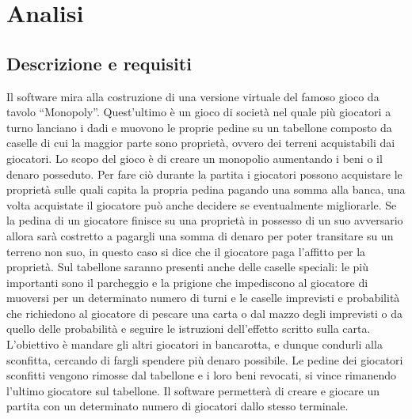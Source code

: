 \chapter{Analisi}

\section{Descrizione e requisiti}
Il software mira alla costruzione di una versione virtuale del famoso gioco da tavolo “Monopoly”. 
Quest’ultimo è un gioco di società nel quale più giocatori a turno lanciano i dadi e muovono le proprie pedine su un tabellone 
composto da caselle di cui la maggior parte sono proprietà, ovvero dei terreni acquistabili dai giocatori.
Lo scopo del gioco è di creare un monopolio aumentando i beni o il denaro posseduto. 
Per fare ciò durante la partita i giocatori possono acquistare le proprietà sulle quali capita la propria pedina pagando una somma alla banca, 
una volta acquistate il giocatore può anche decidere se eventualmente migliorarle.
Se la pedina di un giocatore finisce su una proprietà in possesso di un suo avversario allora sarà costretto
a pagargli una somma di denaro per poter transitare su un terreno non suo, in questo caso si dice che il giocatore
paga l'affitto per la proprietà.\newline
Sul tabellone saranno presenti anche delle caselle speciali: le più importanti sono il parcheggio e la prigione che
impediscono al giocatore di muoversi per un determinato numero di turni e le caselle imprevisti e probabilità che 
richiedono al giocatore di pescare una carta o dal mazzo degli imprevisti o da quello delle probabilità e seguire le 
istruzioni dell'effetto scritto sulla carta.\newline
L’obiettivo è mandare gli altri giocatori in bancarotta, e dunque condurli alla sconfitta, cercando di fargli spendere
più denaro possibile. Le pedine dei giocatori sconfitti vengono rimosse dal tabellone e i loro 
beni revocati, si vince rimanendo l'ultimo giocatore sul tabellone.\newline
Il software permetterà di creare e giocare un partita con un determinato numero di giocatori dallo 
stesso terminale.


